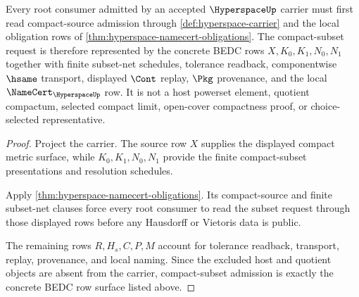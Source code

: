 \begin{theorem}
\label{thm:hyperspace-compact-subset-root-admission}
Every root consumer admitted by an accepted $\HyperspaceUp$ carrier must first read compact-source admission through \autoref{def:hyperspace-carrier} and the local obligation rows of \autoref{thm:hyperspace-namecert-obligations}. The compact-subset request is therefore represented by the concrete BEDC rows $X,K_0,K_1,N_0,N_1$ together with finite subset-net schedules, tolerance readback, componentwise $\hsame$ transport, displayed $\Cont$ replay, $\Pkg$ provenance, and the local $\NameCert_{\HyperspaceUp}$ row. It is not a host powerset element, quotient compactum, selected compact limit, open-cover compactness proof, or choice-selected representative.
\end{theorem}
\begin{proof}
Project the carrier. The source row $X$ supplies the displayed compact metric surface, while $K_0,K_1,N_0,N_1$ provide the finite compact-subset presentations and resolution schedules.

Apply \autoref{thm:hyperspace-namecert-obligations}. Its compact-source and finite subset-net clauses force every root consumer to read the subset request through those displayed rows before any Hausdorff or Vietoris data is public.

The remaining rows $R,H_s,C,P,M$ account for tolerance readback, transport, replay, provenance, and local naming. Since the excluded host and quotient objects are absent from the carrier, compact-subset admission is exactly the concrete BEDC row surface listed above.
\end{proof}

